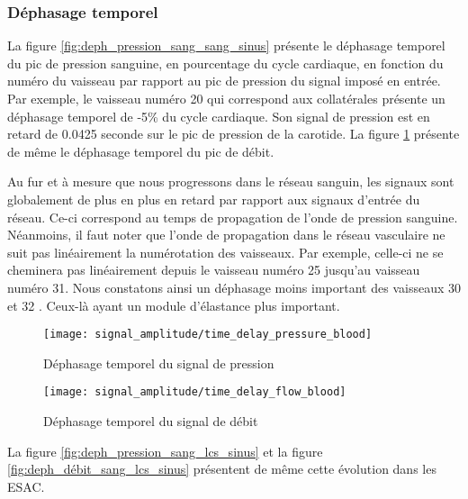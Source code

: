 \documentclass[french]{report}
\begin{document}
\subsubsection{Déphasage temporel}

La figure \ref{fig:deph_pression_sang_sang_sinus} présente le déphasage temporel du pic de pression sanguine, en pourcentage du cycle cardiaque, en fonction du numéro du vaisseau par rapport au pic de pression du signal imposé en entrée. Par exemple, le vaisseau numéro 20 qui correspond aux collatérales présente un déphasage temporel de -5\% du cycle cardiaque. Son signal de pression est en retard de 0.0425 seconde sur le pic de pression de la carotide.
La figure \ref{fig:deph_débit_sang_sang_sinus} présente de même le déphasage temporel du pic de débit.

Au fur et à mesure que nous progressons dans le réseau sanguin, les signaux sont globalement de plus en plus en retard par rapport aux signaux d'entrée du réseau. Ce-ci correspond au temps de propagation de l'onde de pression sanguine. Néanmoins, il faut noter que l'onde de propagation dans le réseau vasculaire ne suit pas linéairement la numérotation des vaisseaux. Par exemple, celle-ci ne se cheminera pas linéairement depuis le vaisseau numéro 25 jusqu'au vaisseau numéro 31. Nous constatons ainsi un déphasage moins important des vaisseaux 30 et 32 . Ceux-là ayant un module d'élastance plus important.

\begin{figure}
  \begin{minipage}{0.5\linewidth}
    \centering
    \texttt{[image: signal\_amplitude/time\_delay\_pressure\_blood]}
    \caption{Déphasage temporel du signal de pression}
    \label{fig:deph_pression_sang_sang_sinus}
  \end{minipage}
  \hspace{0.5cm}
  \begin{minipage}{0.5\linewidth}
    \centering
    \texttt{[image: signal\_amplitude/time\_delay\_flow\_blood]}
    \caption{Déphasage temporel du signal de débit}
    \label{fig:deph_débit_sang_sang_sinus}
  \end{minipage}
  
\end{figure}

La figure \ref{fig:deph_pression_sang_lcs_sinus} et la figure \ref{fig:deph_débit_sang_lcs_sinus} présentent de même cette évolution dans les ESAC.
\end{document}
